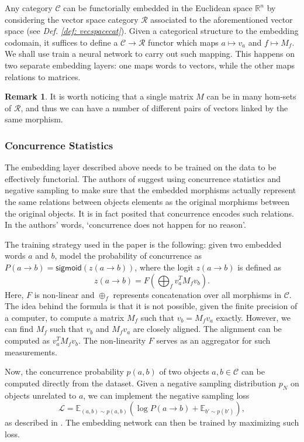 \documentclass[11pt,a4paper,openright,twoside]{report}
\theoremstyle{plain}
\theoremstyle{definition}
\newtheorem{remark}[proposition]{Remark}
\begin{document}
Any category $\mathcal{C}$ can be functorially embedded in the Euclidean space $\mathbb{R}^n$ by considering the vector space category $\mathcal{R}$ associated to the aforementioned vector space (see \textit{Def. \ref{def: vecspacecat}}). Given a categorical structure to the embedding codomain, it suffices to define a $\mathcal{C} \to \mathcal{R}$ functor which maps $a \mapsto v_a$ and $f \mapsto M_f$. We shall use train a neural network to carry out such mapping. This happens on two separate embedding layers: one maps words to vectors, while the other maps relations to matrices.  

\begin{remark}
  It is worth noticing that a single matrix $M$ can be in many hom-sets of $\mathcal{R}$, and thus we can have a number of different pairs of vectors linked by the same morphism.
\end{remark}


\subsubsection{Concurrence Statistics}

The embedding layer described above needs to be trained on the data to be effectively functorial. The authors of \cite{sheshmaniCategoricalRepresentationLearning2022} suggest using concurrence statistics and negative sampling to make sure that the embedded morphisms actually represent the same relations between objects elements as the original morphisms between the original objects. It is in fact posited that concurrence encodes such relations. In the authors' words, \lq  concurrence does not happen for no reason\rq.


The training strategy used in the paper is the following: given two embedded words $a$ and $b$, model the probability of concurrence as $P(a \to b) = \mathsf{sigmoid}(z(a \to b))$, where the logit $z(a \to b)$ is defined as
\[z(a \to b) = F\left(\bigoplus_f v_a^TM_fv_b \right).\]
Here, $F$ is non-linear and $\oplus_f$ represents concatenation over all morphisms in $\mathcal{C}$. The idea behind the formula is that it is not possible, given the finite precision of a computer, to compute a matrix $M_f$ such that $v_b = M_fv_a$ exactly. However, we can find $M_f$ such that $v_b$ and $M_fv_a$ are closely aligned. The alignment can be computed as $v_a^TM_fv_b$. The non-linearity $F$ serves as an aggregator for such measurements.


Now, the concurrence probability $p(a,b)$ of two objects $a,b \in \mathcal{C}$ can be computed directly from the dataset. Given a negative sampling distribution $p_N$ on objects unrelated to $a$, we can implement the negative sampling loss
\[\mathcal{L} = \mathbb{E}_{(a,b) \sim p(a,b)}\left(\log P(a \to b) + \mathbb{E}_{b' \sim p(b')}\right),\]
as described in \cite{sheshmaniCategoricalRepresentationLearning2022}. The embedding network can then be trained by maximizing such loss.
\end{document}
